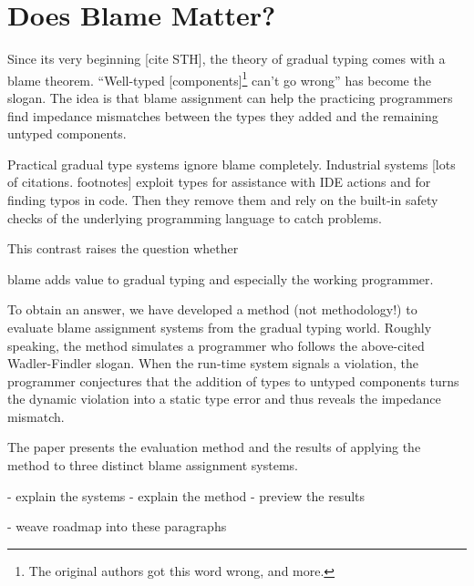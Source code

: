 \section{Does Blame Matter?}

Since its very beginning [cite STH], the theory of gradual typing
comes with a blame theorem. ``Well-typed [components]\footnote{The
original authors got this word wrong, and more.} can't go wrong'' has
become the slogan. The idea is that blame assignment can help the
practicing programmers find impedance mismatches between the types
they added and the remaining untyped components.

Practical gradual type systems ignore blame completely. Industrial
systems [lots of citations. footnotes] exploit types for assistance
with IDE actions and for finding typos in code. Then they remove them
and rely on the built-in safety checks of the underlying programming
language to catch problems.

This contrast raises the question whether

     blame adds value to gradual typing
     and especially the working programmer.

To obtain an answer, we have developed a method (not methodology!)  to
evaluate blame assignment systems from the gradual typing
world. Roughly speaking, the method simulates a programmer who follows
the above-cited Wadler-Findler slogan. When the run-time system
signals a violation, the programmer conjectures that the addition of 
types to untyped components turns the dynamic violation into a static
type error and thus reveals the impedance mismatch.

The paper presents the evaluation method and the results of applying
the method to three distinct blame assignment systems.

- explain the systems
- explain the method
- preview the results

- weave roadmap into these paragraphs 

